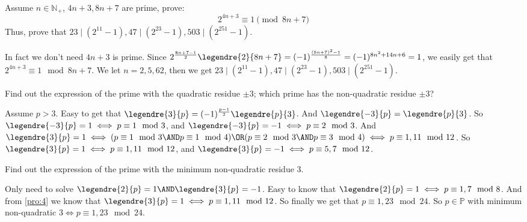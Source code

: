 \documentclass{ctexart}
\begin{document}
\begin{problem}\label{pro:3}
  Assume \(n \in \mathbb{N}_+\), \(4n + 3,8n + 7\) are prime, prove:
  \[
    2^{4n + 3}\equiv 1 \pmod{8n + 7}
  \]
  Thus, prove that \(23 \mid(2^{11}-1),47 \mid (2^{23}-1),503 \mid (2^{251}-1)\).
\end{problem}
\begin{solution}
  In fact we don't need \(4n+3\) is prime.
  Since \(2^{\frac{8n+7-1}{2}}\legendre{2}{8n+7}=(-1)^{\frac{(8n+7)^2-1}{8}}=(-1)^{8n^2+14n+6}=1\),
  we easily get that \(2^{4n+3}\equiv 1 \mod 8n+7\).
  We let \(n=2,5,62\), then we get \(23 \mid(2^{11}-1),47 \mid (2^{23}-1),503 \mid (2^{251}-1)\).
\end{solution}

\begin{problem}\label{pro:4}
  Find out the expression of the prime with the quadratic residue \(\pm 3\);
  which prime has the non-quadratic residue \(\pm 3\)?
\end{problem}
\begin{solution}
  Assume \(p>3\).
  Easy to get that \(\legendre{3}{p}=(-1)^{\frac{p-1}{2}}\legendre{p}{3}\).
  And \(\legendre{-3}{p}=\legendre{p}{3}\).
  So \(\legendre{-3}{p}=1 \iff p \equiv 1 \mod 3\), and \( \legendre{-3}{p}=-1 \iff p \equiv 2 \mod 3\).
  And \(\legendre{3}{p}=1 \iff (p \equiv 1 \mod 3 \AND p \equiv 1 \mod 4)\OR(p \equiv 2 \mod 3 \AND p \equiv 3 \mod 4) \iff p \equiv 1,11 \mod 12\).
  So \(\legendre{3}{p}=1 \iff p \equiv 1,11 \mod 12\), and \(\legendre{3}{p}=-1 \iff p \equiv 5,7 \mod 12\).
\end{solution}

\begin{problem}\label{pro:5}
  Find out the expression of the prime with the minimum non-quadratic residue \( 3\).
\end{problem}
\begin{solution}
  Only need to solve \(\legendre{2}{p}=1 \AND \legendre{3}{p}=-1\).
  Easy to know that \(\legendre{2}{p}=1 \iff p \equiv 1,7 \mod 8\).
  And from \ref{pro:4} we know that \(\legendre{3}{p}=1 \iff p \equiv 1,11 \mod 12\).
  So finally we get that \(p \equiv 1,23 \mod 24\).
  So \(p \in \mathbb{P}\) with minimum non-quadratic \(3 \iff p \equiv 1,23 \mod 24\).
\end{solution}
\end{document}
